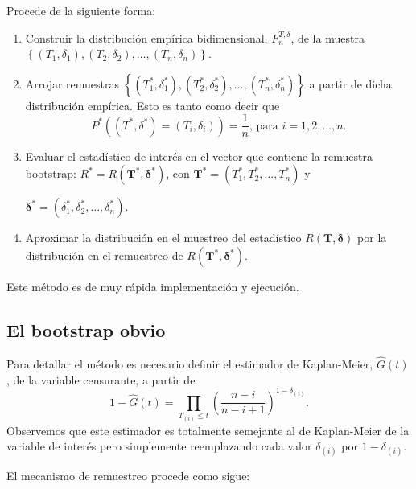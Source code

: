 \documentclass[]{book}
\theoremstyle{definition}
\theoremstyle{definition}
\theoremstyle{definition}
\theoremstyle{remark}
\begin{document}
Procede de la siguiente forma:

\begin{enumerate}
\def\labelenumi{\arabic{enumi}.}
\item
  Construir la distribución empírica bidimensional, \(F_n^{T,\delta }\),
  de la muestra
  \(\left\{ \left( T_1,\delta _1 \right), \left( T_2,\delta _2 \right), \ldots, \left( T_n,\delta _n \right) \right\}\).
\item
  Arrojar remuestras
  \(\left\{ \left( T_1^{\ast},\delta _1^{\ast} \right), \left( T_2^{\ast},\delta _2^{\ast} \right), \ldots, \left( T_n^{\ast},\delta _n^{\ast} \right) \right\}\)
  a partir de dicha distribución empírica. Esto es tanto como decir
  que\[P^{\ast}\left( \left( T^{\ast},\delta^{\ast} \right) =\left( T_i,\delta
  _i \right) \right) =\frac{1}{n}\text{, para }i=1,2,\ldots ,n\text{.}\]
\item
  Evaluar el estadístico de interés en el vector que contiene la
  remuestra bootstrap:
  \(R^{\ast}=R\left( \mathbf{T}^{\ast}, \boldsymbol{\delta}^{\ast} \right)\),
  con
  \(\mathbf{T}^{\ast} =\left( T_1^{\ast},T_2^{\ast},\ldots ,T_n^{\ast} \right)\)
  y

  \(\boldsymbol{\delta}^{\ast}=\left( \delta _1^{\ast},\delta _2^{\ast},\ldots ,\delta _n^{\ast} \right)\).
\item
  Aproximar la distribución en el muestreo del estadístico
  \(R\left( \mathbf{T}, \boldsymbol{\delta} \right)\) por la
  distribución en el remuestreo de
  \(R\left( \mathbf{T}^{\ast},\boldsymbol{\delta}^{\ast} \right)\).
\end{enumerate}

Este método es de muy rápida implementación y ejecución.

\subsection{El bootstrap obvio}\label{el-bootstrap-obvio}

Para detallar el método es necesario definir el estimador de
Kaplan-Meier, \(\hat{G}\left( t \right)\), de la variable censurante, a
partir
de\[1-\hat{G}\left( t \right) =\prod_{T_{(i)}\leq t}\left( \frac{n-i
}{n-i+1} \right)^{1-\delta _{(i)}}.\] Observemos que este estimador es
totalmente semejante al de Kaplan-Meier de la variable de interés pero
simplemente reemplazando cada valor \(\delta _{(i)}\) por
\(1-\delta _{(i)}\).

El mecanismo de remuestreo procede como sigue:
\end{document}

